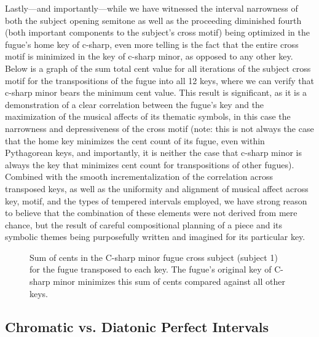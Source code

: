 Lastly---and importantly---while we have witnessed the interval
narrowness of both the subject opening semitone as well as the
proceeding diminished fourth (both important components to the subject's
cross motif) being optimized in the fugue's home key of c-sharp, even
more telling is the fact that the entire cross motif is minimized in the
key of c-sharp minor, as opposed to any other key. Below is a graph of
the sum total cent value for all iterations of the subject cross motif
for the transpositions of the fugue into all 12 keys, where we can
verify that c-sharp minor bears the minimum cent value. This result is
significant, as it is a demonstration of a clear correlation between the
fugue's key and the maximization of the musical affects of its thematic
symbols, in this case the narrowness and depressiveness of the cross
motif (note: this is not always the case that the home key minimizes the
cent count of its fugue, even within Pythagorean keys, and importantly,
it is neither the case that c-sharp minor is always the key that
minimizes cent count for transpositions of other fugues). Combined with
the smooth incrementalization of the correlation across transposed keys,
as well as the uniformity and alignment of musical affect across key,
motif, and the types of tempered intervals employed, we have strong
reason to believe that the combination of these elements were not
derived from mere chance, but the result of careful compositional
planning of a piece and its symbolic themes being purposefully written
and imagined for its particular key.




\begin{figure}[H]
\vspace{1.5em}
    \centering
    \caption[Sum of cents in the C-sharp minor fugue cross subject (subject 1) for the fugue transposed to each key. ]{Sum of cents in the C-sharp minor fugue cross subject (subject 1) for the fugue transposed to each key. The fugue's original key of C-sharp minor minimizes this sum of cents compared against all other keys.}
\end{figure}    \subsection{Chromatic vs. Diatonic Perfect
Intervals}\label{chromatic-vs.-diatonic-perfect-intervals}

